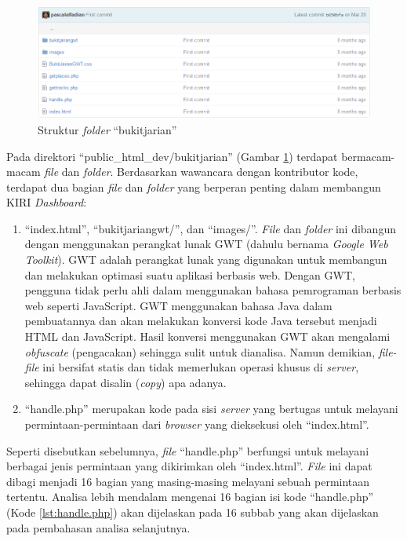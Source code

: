 \begin{figure}[htbp]
	\centering
		\includegraphics[scale=0.5]{Gambar/3_bukit_jarian.png}
	\caption{Struktur \textit{folder} ``bukitjarian''}
	\label{fig:3_bukit_jarian}
\end{figure}

Pada direktori ``public\_html\_dev/bukitjarian'' (Gambar \ref{fig:3_bukit_jarian}) terdapat bermacam-macam \textit{file} dan \textit{folder}. Berdasarkan wawancara dengan kontributor kode, terdapat dua bagian \textit{file} dan \textit{folder} yang berperan penting dalam membangun KIRI \textit{Dashboard}:
\begin{enumerate}
	\item ``index.html'', ``bukitjariangwt/'', dan ``images/''. \textit{File} dan \textit{folder} ini dibangun dengan menggunakan perangkat lunak GWT (dahulu bernama \textit{Google Web Toolkit}). GWT adalah perangkat lunak yang digunakan untuk membangun dan melakukan optimasi suatu aplikasi berbasis web\cite{gwt}. Dengan GWT, pengguna tidak perlu ahli dalam menggunakan bahasa pemrograman berbasis web seperti JavaScript. GWT menggunakan bahasa Java dalam pembuatannya dan akan melakukan konversi kode Java tersebut menjadi HTML dan JavaScript. Hasil konversi menggunakan GWT akan mengalami \textit{obfuscate} (pengacakan) sehingga sulit untuk dianalisa. Namun demikian, \textit{file-file} ini bersifat statis dan tidak memerlukan operasi khusus di \textit{server}, sehingga dapat disalin (\textit{copy}) apa adanya. 
	\item ``handle.php'' merupakan kode pada sisi \textit{server} yang bertugas untuk melayani permintaan-permintaan dari \textit{browser} yang dieksekusi oleh ``index.html''.
\end{enumerate}

Seperti disebutkan sebelumnya, \textit{file} ``handle.php'' berfungsi untuk melayani berbagai jenis permintaan yang dikirimkan oleh ``index.html''. \textit{File} ini dapat dibagi menjadi 16 bagian yang masing-masing melayani sebuah permintaan tertentu. Analisa lebih mendalam mengenai 16 bagian isi kode ``handle.php'' (Kode \ref{lst:handle.php}) akan dijelaskan pada 16 subbab yang akan dijelaskan pada pembahasan analisa selanjutnya.

